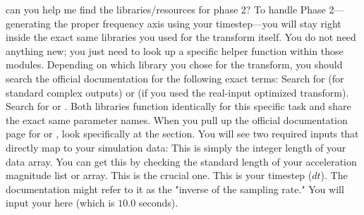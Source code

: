 {}\markdownRendererThematicBreak{}\markdownRendererInterblockSeparator
{}
\markdownRendererSectionEnd 
\markdownRendererSectionEnd \markdownRendererSectionBegin
{}\markdownRendererInterblockSeparator
{}can you help me find the libraries/resources for phase 2?\markdownRendererInterblockSeparator
{}
\markdownRendererSectionEnd \markdownRendererSectionBegin
{}\markdownRendererInterblockSeparator
{}To handle Phase 2—generating the proper frequency axis using your timestep—you will stay right inside the exact same libraries you used for the transform itself. You do not need anything new; you just need to look up a specific helper function within those modules.\markdownRendererInterblockSeparator
{}\markdownRendererSectionBegin
{}\markdownRendererInterblockSeparator
{}Depending on which library you chose for the transform, you should search the official documentation for the following exact terms:\markdownRendererInterblockSeparator
{}\markdownRendererUlBegin
\markdownRendererUlItem {} Search for  (for standard complex outputs) or  (if you used the real-input optimized transform).\markdownRendererUlItemEnd 
\markdownRendererUlItem {} Search for  or .\markdownRendererUlItemEnd 
\markdownRendererUlEnd \markdownRendererInterblockSeparator
{}Both libraries function identically for this specific task and share the exact same parameter names.\markdownRendererInterblockSeparator
{}
\markdownRendererSectionEnd \markdownRendererSectionBegin
{}\markdownRendererInterblockSeparator
{}When you pull up the official documentation page for  or , look specifically at the  section. You will see two required inputs that directly map to your simulation data:\markdownRendererInterblockSeparator
{}\markdownRendererOlBegin
{} This is simply the integer length of your data array. You can get this by checking the standard length of your acceleration magnitude list or array.\markdownRendererOlItemEnd 
{} This is the crucial one. This is your timestep ($dt$). The documentation might refer to it as the "inverse of the sampling rate." You will input your  here (which is $10.0$ seconds).\markdownRendererOlItemEnd 
